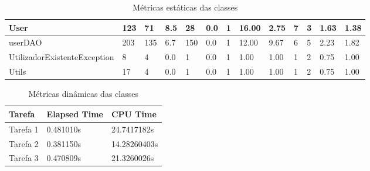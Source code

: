 \begin{table}[ht]
\begin{adjustbox}{width=1\textwidth}
\begin{tabular}{|l|l|l|l|l|l|l|l|l|l|l|l|l|}
User                         & 123          & 71         & 8.5             & 28       & 0.0            & 1       & 16.00           & 2.75                       & 7                   & 3                   & 1.63               & 1.38               \\ \hline
userDAO                      & 203          & 135        & 6.7             & 150      & 0.0            & 1       & 12.00           & 9.67                       & 6                   & 5                   & 2.23               & 1.82               \\ \hline
UtilizadorExistenteException & 8            & 4          & 0.0             & 1        & 0.0            & 1       & 1.00            & 1.00                       & 1                   & 2                   & 0.75               & 1.00               \\ \hline
Utils                        & 17           & 4          & 0.0             & 1        & 0.0            & 1       & 1.00            & 1.00                       & 1                   & 2                   & 0.75               & 1.00               \\ \hline
\end{tabular}
\end{adjustbox}
\caption{Métricas estáticas das classes}
\end{table}

\begin{table}[H]
\centering
\begin{tabular}{|l|l|l|}
\hline
Tarefa   & Elapsed Time & CPU Time    \\ \hline
Tarefa 1 & 0.481010s    & 24.7417182s \\ \hline
Tarefa 2 & 0.381150s    & 14.28260403s \\ \hline
Tarefa 3 & 0.470809s    & 21.3260026s \\ \hline
\end{tabular}
\caption{Métricas dinâmicas das classes}
\end{table}